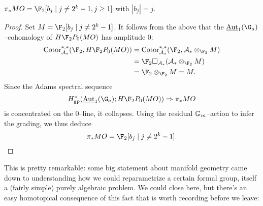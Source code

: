 \begin{corollary}
$\pi_* MO = \F_2[b_j \mid j \ne 2^k - 1, j \ge 1]$ with $|b_j| = j$.
\end{corollary}
\begin{proof}
Set $M = \F_2[b_j \mid j \ne 2^k - 1]$.   It follows from the above that the $\InternalAut_1(\G_a)$--cohomology of $H\F_2P_0(MO)$ has amplitude $0$:
\begin{align*}
\Cotor_{\mathcal A_*}^{*, *}(\F_2, H\F_2P_0(MO)) & = \Cotor_{\mathcal A_*}^{*, *}(\F_2, \mathcal A_* \otimes_{\F_2} M) \\
& = \F_2 \cotensor_{\mathcal A_*} (\mathcal A_* \otimes_{\F_2} M) \\
& = \F_2 \otimes_{\F_2} M = M.
\end{align*}
Since the Adams spectral sequence \[H^*_{\mathrm{gp}}(\InternalAut_1(\G_a); H\F_2P_0(MO)) \Rightarrow \pi_* MO\] is concentrated on the $0$--line, it collapses.  Using the residual $\mathbb G_m$--action to infer the grading, we thus deduce \[\pi_* MO = \F_2[b_j \mid j \ne 2^k-1]. \qedhere\]
\end{proof}

This is pretty remarkable: some big statement about manifold geometry came down to understanding how we could reparametrize a certain formal group, itself a (fairly simple) purely algebraic problem.  We could close here, but there's an easy homotopical consequence of this fact that is worth recording before we leave:


